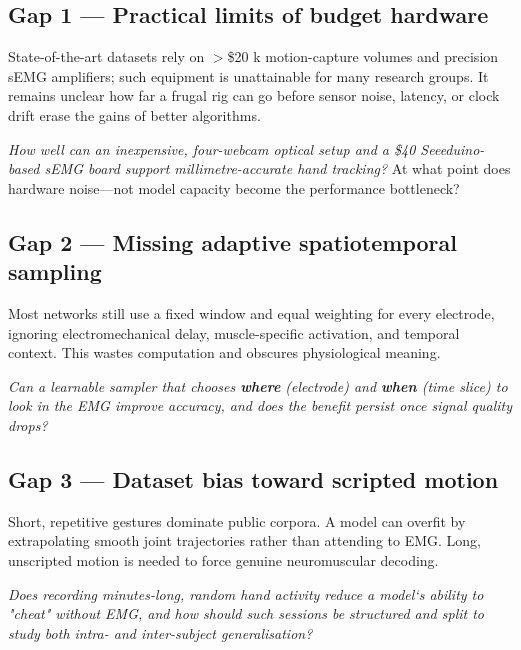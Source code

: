 \subsection*{Gap 1 — Practical limits of budget hardware}

State-of-the-art datasets rely on \(>\)\$20 k motion-capture volumes and
precision sEMG amplifiers; such equipment is unattainable for many research
groups.  It remains unclear how far a frugal rig can go before sensor noise,
latency, or clock drift erase the gains of better algorithms.

\begin{description}[style=unboxed,leftmargin=0pt]
\item[\textbf{RQ-A}] \emph{How well can an inexpensive, four-webcam optical
      setup and a \$40 Seeeduino-based sEMG board support millimetre-accurate
      hand tracking?}  At what point does hardware noise—not model capacity
      become the performance bottleneck?
\end{description}

\subsection*{Gap 2 — Missing adaptive spatiotemporal sampling}

Most networks still use a fixed window and equal weighting for every electrode,
ignoring electromechanical delay, muscle-specific activation, and temporal
context. This wastes computation and obscures physiological meaning.

\begin{description}[style=unboxed,leftmargin=0pt]
\item[\textbf{RQ-B}] \emph{Can a learnable sampler that chooses \textbf{where}
      (electrode) and \textbf{when} (time slice) to look in the EMG improve
      accuracy, and does the benefit persist once signal quality drops?}
\end{description}

\subsection*{Gap 3 — Dataset bias toward scripted motion}

Short, repetitive gestures dominate public corpora.  A model can overfit by
extrapolating smooth joint trajectories rather than attending to EMG. Long,
unscripted motion is needed to force genuine neuromuscular decoding.

\begin{description}[style=unboxed,leftmargin=0pt]
\item[\textbf{RQ-C}] \emph{Does recording minutes-long, random hand activity
      reduce a model`s ability to "cheat" without EMG, and how should such
      sessions be structured and split to study both intra- and inter-subject
      generalisation?}
\end{description}
